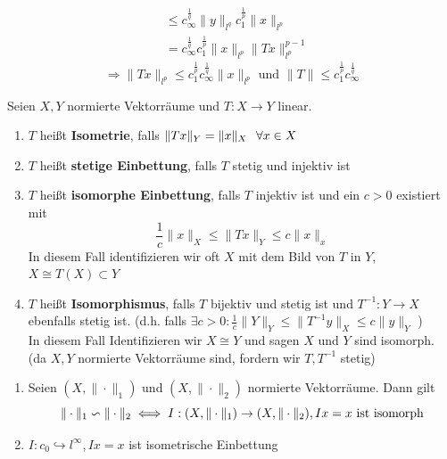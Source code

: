 \begin{beispiel}[Matrizenmultiplikation]
\begin{enumerate}[label=\alph*\upshape)]
\begin{beweis}
\begin{align*}
		 	& \leq c_{\infty}^{\frac{1}{q}} \| y \|_{l^{q}} c_{1}^{\frac{1}{p}} \| x \|_{l^{p}} \\
		 	& =  c_{\infty}^{\frac{1}{q}} c_{1}^{\frac{1}{p}}  \| x \|_{l^{p}} \| Tx \|_{l^{p}}^{p - 1} 
		 \end{align*}
		 \[ \Rightarrow \| Tx \|_{l^{p}} \leq c_{1}^{\frac{1}{p}} c_{\infty}^{\frac{1}{q}} \| x \|_{l^{p}} \text{ und } \| T\| \leq c_{1}^{\frac{1}{p}} c_{\infty}^{\frac{1}{q}} \]
		\end{beweis}
 \end{enumerate}
\end{beispiel}

\begin{definition}
	Seien $X, Y$ normierte Vektorräume und $T: X \rightarrow Y$ linear.
	\begin{enumerate}[label=\alph*\upshape)]

		\item $T$ hei{\ss}t \textbf{Isometrie},  falls $ \| Tx \|_{Y} = \| x \|_{X} \hspace{0.25cm} \forall x \in X $
		\item $T$ hei{\ss}t \textbf{stetige Einbettung},  falls $T$ stetig und injektiv ist
		\item $T$ hei{\ss}t \textbf{isomorphe Einbettung},  falls $T$ injektiv ist und ein $c > 0$ existiert mit
			\[ \frac{1}{c} \| x \|_{X} \leq \| Tx \|_{Y} \leq c \| x \|_{x} \]
			In diesem Fall identifizieren wir oft $X$ mit dem Bild von $T$ in $Y$, $X \cong T(X) \subset Y$ 
		\item $T$ hei{\ss}t \textbf{Isomorphismus},  falls $T$ bijektiv und stetig ist und $T^{-1}: Y \rightarrow X$ ebenfalls stetig ist.
			(d.h. falls $\exists c > 0: \frac{1}{c} \| Y \|_{Y} \leq \| T^{-1}y \|_{X} \leq c \| y \|_{Y}$ ) \\
			In diesem Fall Identifizieren wir $X \cong Y$ und sagen $X$ und $Y$ sind isomorph. \\
			(da $X, Y$ normierte Vektorräume sind, fordern wir $T, T^{-1}$ stetig)
	\end{enumerate}
\end{definition}

\begin{beispiel}
	\begin{enumerate}[label=\alph*\upshape)]
		\item Seien $(X, \| \cdot \|_{1})$ und $(X, \| \cdot \|_{2})$ normierte Vektorräume. Dann gilt
			\[ \| \cdot \|_{1} \backsim \| \cdot \|_{2} \iff I: (X, \| \cdot \|_{1}) \rightarrow (X, \| \cdot \|_{2}), Ix = x \text{ ist isomorph} \]
		\item $I: c_{0} \hookrightarrow l^{\infty}, I x = x$ ist isometrische Einbettung
	\end{enumerate}
\end{beispiel}

